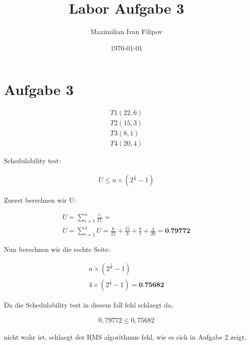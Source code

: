 \documentclass[11pt]{article}
\author{Maximilian Ivan Filipov}
\date{\today}
\title{Labor Aufgabe 3}
\begin{document}
\maketitle
\tableofcontents

\newpage
\section{Aufgabe 3}
\label{sec:org58b2db2}

\begin{gather*}
T1(22,6) \\
T2(15,3) \\
T3(8, 1) \\
T4(20,4) 
\end{gather*}


\begin{center}
Schedulability test:
\end{center}
\begin{gather*}
  U \leq n\times(2^\frac{1}{n}-1)
\end{gather*}


\begin{center}
Zuerst berechnen wir U:
\end{center}
\begin{gather*}
U = \sum_{i=1}^{n}\frac{e_i}{D_i} = \\
U = \sum_{i=1}^{4}
U = \frac{6}{22} + \frac{15}{3} + \frac{8}{1} + \frac{4}{20} = \textbf{0.79772}
\end{gather*}
\begin{center}
Nun berechnen wir die rechte Seite: 
\end{center}
\begin{gather*}
n \times (2^\frac{1}{n}-1) \\
4 \times (2^\frac{1}{4} - 1) = \textbf{0.75682}
\end{gather*}
\begin{center}
Da die Schedulability test in diesem fall fehl schlaegt da,
\end{center}
\begin{gather*}
  0,79772 \leq 0,75682
\end{gather*}
\begin{center}
nicht wahr ist, schlaegt der RMS algorithmus fehl, wie es sich in Aufgabe 2 zeigt.
\end{center}
\end{document}

